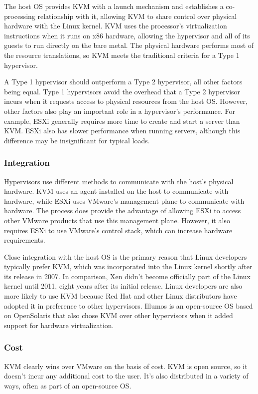 \documentclass[14pt]{extreport}
\begin{document}
The host OS provides KVM with a launch mechanism and establishes a co-processing relationship with it, allowing KVM to share control over physical hardware with the Linux kernel. KVM uses the processor’s virtualization instructions when it runs on x86 hardware, allowing the hypervisor and all of its guests to run directly on the bare metal. The physical hardware performs most of the resource translations, so KVM meets the traditional criteria for a Type 1 hypervisor.

A Type 1 hypervisor should outperform a Type 2 hypervisor, all other factors being equal. Type 1 hypervisors avoid the overhead that a Type 2 hypervisor incurs when it requests access to physical resources from the host OS. However, other factors also play an important role in a hypervisor’s performance. For example, ESXi generally requires more time to create and start a server than KVM. ESXi also has slower performance when running servers, although this difference may be insignificant for typical loads.
\subsubsection{Integration}
Hypervisors use different methods to communicate with the host’s physical hardware. KVM uses an agent installed on the host to communicate with hardware, while ESXi uses VMware’s management plane to communicate with hardware. The process does provide the advantage of allowing ESXi to access other VMware products that use this management plane. However, it also requires ESXi to use VMware’s control stack, which can increase hardware requirements.

Close integration with the host OS is the primary reason that Linux developers typically prefer KVM, which was incorporated into the Linux kernel shortly after its release in 2007. In comparison, Xen didn’t become officially part of the Linux kernel until 2011, eight years after its initial release. Linux developers are also more likely to use KVM because Red Hat and other Linux distributors have adopted it in preference to other hypervisors. Illumos is an open-source OS based on OpenSolaris that also chose KVM over other hypervisors when it added support for hardware virtualization.
\subsubsection{Cost}

KVM clearly wins over VMware on the basis of cost. KVM is open source, so it doesn’t incur any additional cost to the user. It’s also distributed in a variety of ways, often as part of an open-source OS.
\end{document}
